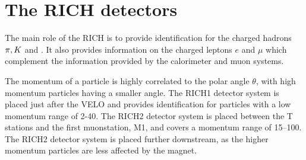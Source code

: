 




   
\section{The RICH detectors}
\label{sec:rich}
The main role of the \Gls{RICH} is to provide identification for the charged hadrons $\pi,{K}$ and \proton. It also provides information on the charged leptons $e$ and $\mu$ which complement the information provided by the calorimeter and muon systems.


The momentum of a particle is highly correlated to the polar angle $\theta$, with high momentum particles having a smaller angle. The RICH1 detector system is placed just after the VELO and provides identification for particles with a low momentum range of 2-40\gevc. The RICH2 detector system is placed between the T stations and the first \gls{muonstation}, M1, and covers a momentum range of 15--100\gevc. The RICH2 detector system is placed further downstream, as the higher momentum particles are less affected by the magnet.

